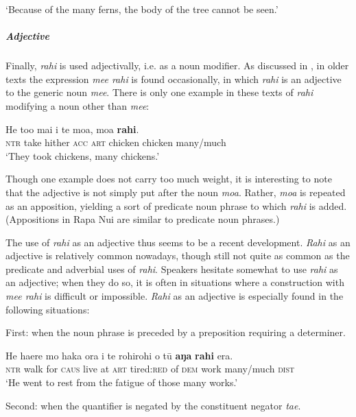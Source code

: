 \glt 
‘Because of the many ferns, the body of the tree cannot be seen.’ \textstyleExampleref{[R497.005]} 
\z

\subparagraph{Adjective} Finally, \textit{rahi} is used adjectivally, i.e. as a noun modifier. As discussed in , in older texts the expression \textit{me{\ꞌ}e rahi} is found occasionally, in which \textit{rahi} is an adjective to the generic noun \textit{me{\ꞌ}e}. There is only one example in these texts of \textit{rahi} modifying a noun other than \textit{me{\ꞌ}e}:

\ea\label{ex:4.101}
\gll He to{\ꞌ}o mai i te moa, moa \textbf{rahi}. \\
\textsc{ntr} take hither \textsc{acc} \textsc{art} chicken chicken many/much \\

\glt
‘They took chickens, many chickens.’ \textstyleExampleref{[Ley-9-55.012]}
\z

Though one example does not carry too much weight, it is interesting to note that the adjective is not simply put after the noun \textit{moa}. Rather, \textit{moa} is repeated as an apposition, yielding a sort of predicate noun phrase to which \textit{rahi} is added. (Appositions in Rapa Nui are similar to predicate noun phrases.)

The use of \textit{rahi} as an adjective thus seems to be a recent development. \textit{Rahi} as an adjective is relatively common nowadays, though still not quite as common as the predicate and adverbial uses of \textit{rahi}. Speakers hesitate somewhat to use \textit{rahi} as an adjective; when they do so, it is often in situations where a construction with \textit{me{\ꞌ}e rahi} is difficult or impossible. \textit{Rahi} as an adjective is especially found in the following situations:

First: when the noun phrase is preceded by a preposition requiring a determiner.

\ea\label{ex:4.102}
\gll He ha{\ꞌ}ere mo haka ora {\ꞌ}i te rohirohi o tū \textbf{aŋa} \textbf{rahi} era.\\
\textsc{ntr} walk for \textsc{caus} live at \textsc{art} tired:\textsc{red} of \textsc{dem} work many/much \textsc{dist}\\

\glt
‘He went to rest from the fatigue of those many works.’ \textstyleExampleref{[R233.069]} 
\z

Second: when the quantifier is negated by the constituent negator \textit{ta{\ꞌ}e}.

